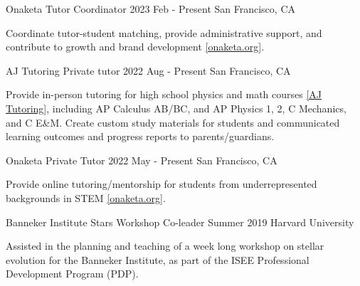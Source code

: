 
\begin{cventries}

  \cventry
    {Onaketa} %
    {Tutor Coordinator} %
    {2023 Feb - Present} %
    {San Francisco, CA} %
    {
        \begin{cvitems} %
            \item[] Coordinate tutor-student matching, provide administrative support, and contribute to growth and brand development \href{https://www.onaketa.org/about}{[onaketa.org]}.
        \end{cvitems}
    }
    
  \cventry
    {AJ Tutoring} %
    {Private tutor} %
    {2022 Aug - Present} %
    {San Francisco, CA} %
    {
        \begin{cvitems} %
            \item[] Provide in-person tutoring for high school physics and math courses \href{https://www.ajtutoring.com/meet-our-team/ian-weaver/}{[AJ Tutoring]}, including AP Calculus AB/BC, and AP Physics 1, 2, C Mechanics, and C E\&M. Create custom study materials for students and communicated learning outcomes and progress reports to parents/guardians.
        \end{cvitems}
    }
    
  \cventry
    {Onaketa} %
    {Private Tutor} %
    {2022 May - Present} %
    {San Francisco, CA} %
    {
        \begin{cvitems} %
            \item[] Provide online tutoring/mentorship for students from underrepresented backgrounds in STEM \href{https://www.onaketa.org/about}{[onaketa.org]}.
        \end{cvitems}
    }
    
    
  \cventry
    {Banneker Institute Stars Workshop} %
    {Co-leader} %
    {Summer 2019} %
    {Harvard University} %
    {
        \begin{cvitems} %
            \item[] Assisted in the planning and teaching of a week long workshop on stellar evolution for the Banneker Institute, as part of the ISEE Professional Development Program (PDP).
        \end{cvitems}
    }
    

\end{cventries}
